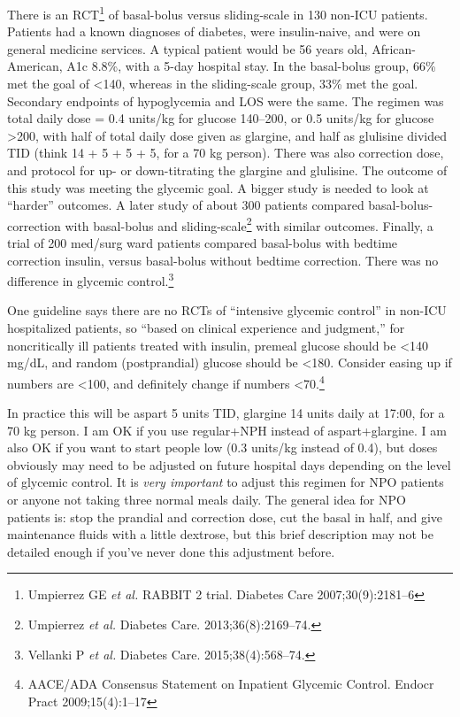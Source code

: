 \documentclass{article}
\begin{document}
There is an RCT\footnote{Umpierrez GE \emph{et al.} RABBIT 2
  trial. Diabetes Care 2007;30(9):2181--6} of basal-bolus versus
sliding-scale in 130 non-ICU patients. Patients had a known diagnoses
of diabetes, were insulin-naive, and were on general medicine
services. A typical patient would be 56 years old, African-American,
A1c 8.8\%, with a 5-day hospital stay. In the basal-bolus group, 66\%
met the goal of <140, whereas in the sliding-scale group, 33\% met the
goal. Secondary endpoints of hypoglycemia and LOS were the same. The
regimen was total daily dose = 0.4 units/kg for glucose 140--200, or
0.5 units/kg for glucose >200, with half of total daily dose given as
glargine, and half as glulisine divided TID (think 14 + 5 + 5 + 5, for
a 70 kg person). There was also correction dose, and protocol for up-
or down-titrating the glargine and glulisine. The outcome of this
study was meeting the glycemic goal. A bigger study is needed to look
at ``harder'' outcomes. A later study of about 300 patients compared
basal-bolus-correction with basal-bolus and
sliding-scale\footnote{Umpierrez \emph{et al.}  Diabetes
  Care. 2013;36(8):2169--74.} with similar outcomes. Finally, a trial
of 200 med/surg ward patients compared basal-bolus with bedtime
correction insulin, versus basal-bolus without bedtime
correction. There was no difference in glycemic
control.\footnote{Vellanki P \emph{et al.} Diabetes
  Care. 2015;38(4):568--74.}

One guideline says there are no RCTs of ``intensive glycemic control''
in non-ICU hospitalized patients, so ``based on clinical experience
and judgment,'' for noncritically ill patients treated with insulin,
premeal glucose should be <140 mg/dL, and random (postprandial)
glucose should be <180. Consider easing up if numbers are <100, and
definitely change if numbers <70.\footnote{AACE/ADA Consensus
  Statement on Inpatient Glycemic Control. Endocr Pract
  2009;15(4):1--17}

In practice this will be aspart 5 units TID, glargine 14 units daily
at 17:00, for a 70 kg person. I am OK if you use regular+NPH instead of
aspart+glargine. I am also OK if you want to start people low (0.3
units/kg instead of 0.4), but doses obviously may need to be adjusted
on future hospital days depending on the level of glycemic control. It
is \emph{very important} to adjust this regimen for NPO patients or
anyone not taking three normal meals daily. The general idea for NPO
patients is: stop the prandial and correction dose, cut the basal in
half, and give maintenance fluids with a little dextrose, but this
brief description may not be detailed enough if you've never done this
adjustment before.
\end{document}
